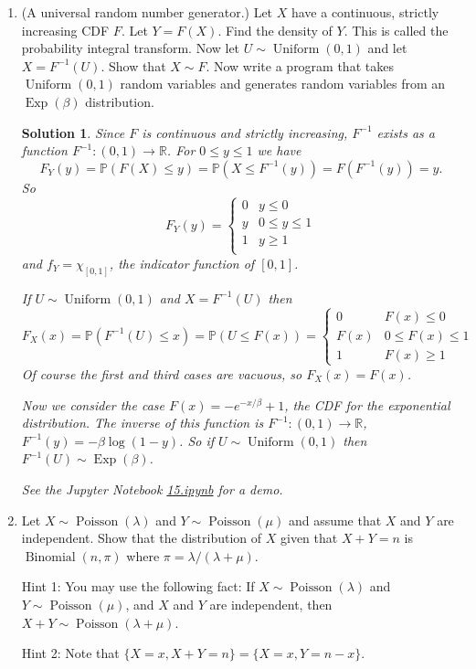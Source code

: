 \documentclass[10pt]{article}
\newtheorem*{sol}{Solution}
\newcommand{\R}{\mathbb{R}}
\renewcommand{\P}{\mathbb{P}}
\newcommand{\Unif}{\operatorname{Uniform}}
\newcommand{\Binom}{\operatorname{Binomial}}
\newcommand{\Poiss}{\operatorname{Poisson}}
\newcommand{\Exp}{\operatorname{Exp}}
\begin{document}
\begin{enumerate}
\item[(15)] (A universal random number generator.)
Let $X$ have a continuous, strictly
increasing CDF $F$. Let $Y = F(X)$. Find the density of $Y$. This is called
the probability integral transform. Now let $U\sim \Unif(0,1)$ and let
$X = F^{-1}(U)$. Show that $X \sim F$. Now write a program that takes
$\Unif(0,1)$ random variables and generates random variables from
an $\Exp(\beta)$ distribution.

\begin{sol}
Since $F$ is continuous and strictly increasing, $F^{-1}$ exists as a function
$F^{-1}:(0,1)\to \R$. For $0\leq y \leq 1$ we have
\[
F_Y(y) = \P(F(X) \leq y) = \P(X \leq F^{-1}(y)) = F(F^{-1}(y))=y.
\]
So
\[
F_Y(y) =
\begin{cases}
0 & y \leq 0 \\
y & 0\leq y\leq 1 \\
1 & y\geq 1 \\
\end{cases}
\]
and $f_Y = \chi_{[0,1]}$, the indicator function of $[0,1]$.

If $U\sim \Unif(0,1)$ and $X=F^{-1}(U)$ then
\[
F_X(x) = \P(F^{-1}(U) \leq x) = \P(U \leq F(x)) =
\begin{cases}
0 & F(x) \leq 0 \\
F(x) & 0\leq F(x) \leq 1 \\
1 & F(x) \geq 1
\end{cases}
\]
Of course the first and third cases are vacuous, so $F_X(x)=F(x)$.

Now we consider the case $F(x)=-e^{-x/\beta}+1$, the CDF for the exponential
distribution. The inverse of this function is $F^{-1}:(0,1)\to \R$,
$F^{-1}(y) = -\beta \log(1-y)$. So if $U\sim \Unif(0,1)$ then
$F^{-1}(U)\sim \Exp(\beta)$.

See the Jupyter Notebook
\href{https://github.com/ajrasmus/some_of_statistics/blob/main/chapter_2/13.ipynb}{15.ipynb}
for a demo.
\end{sol}

\item[(16)]
Let $X \sim \Poiss(\lambda)$ and $Y \sim \Poiss(\mu)$ and assume that $X$ and $Y$
are independent. Show that the distribution of $X$ given that $X + Y = n$ is
$\Binom(n,\pi)$ where $\pi=\lambda/(\lambda+\mu)$.

Hint 1: You may use the following fact: If $X \sim \Poiss(\lambda)$ and
$Y\sim \Poiss(\mu)$, and $X$ and $Y$ are independent, then
$X +Y \sim \Poiss(\lambda+\mu)$.

Hint 2: Note that $\{X = x, X + Y = n\} = \{X = x, Y = n - x\}$.


\end{enumerate}
\end{document}
